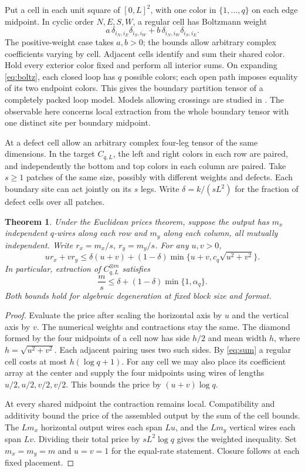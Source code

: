 \documentclass[11pt]{article}
\newtheorem{theorem}{Theorem}
\begin{document}
Put a cell in each unit square of \([0,L]^2\), with one color in
\(\{1,\ldots,q\}\) on each edge midpoint. In cyclic order \(N,E,S,W\),
a regular cell has Boltzmann weight
\begin{equation}\label{eq:boltz}
 a\,\delta_{i_N,i_E}\delta_{i_S,i_W}
 +b\,\delta_{i_N,i_W}\delta_{i_S,i_E}.
\end{equation}
The positive-weight case takes \(a,b>0\); the bounds allow arbitrary
complex coefficients varying by cell. Adjacent cells identify and sum
their shared color. Hold every exterior color fixed and perform all
interior sums. On expanding \eqref{eq:boltz}, each closed loop has \(q\)
possible colors; each open path imposes equality of its two endpoint
colors. This gives the boundary partition tensor of a completely packed
loop model. Models allowing crossings are studied in \cite{loops}.
The observable here concerns local extraction from the whole boundary
tensor with one distinct site per boundary midpoint.

At a defect cell allow an arbitrary complex four-leg tensor of the same
dimensions. In the target \(C_{q,L}\), the left and right colors in each
row are paired, and independently the bottom and top colors in each column
are paired. Take \(s\ge1\) patches of the same size, possibly with different
weights and defects. Each boundary site can act jointly on its \(s\) legs.
Write \(\delta=k/(sL^2)\) for the fraction of defect cells over all patches.

\begin{theorem}\label{thm:lattice}
Under the Euclidean prices theorem, suppose the output has \(m_x\)
independent \(q\)-wires along each row and \(m_y\) along each column,
all mutually independent. Write \(r_x=m_x/s,\ r_y=m_y/s\). For any
\(u,v>0\),
\[
 u r_x+v r_y \le \delta(u+v)
       +(1-\delta)\min\{u+v,c_q\sqrt{u^2+v^2}\}.
\]
In particular, extraction of \(C_{q,L}^{\otimes m}\) satisfies
\[
 \frac ms\le \delta+(1-\delta)\min\{1,\alpha_q\}.
\]
Both bounds hold for algebraic degeneration at fixed block size and format.
\end{theorem}

\begin{proof}
Evaluate the price after scaling the horizontal axis by \(u\) and the
vertical axis by \(v\). The numerical weights and contractions stay the
same. The diamond formed by the four midpoints of a cell now has side
\(h/2\) and mean width \(h\), where \(h=\sqrt{u^2+v^2}\). Each adjacent
pairing uses two such sides. By \eqref{eq:sum} a regular cell costs at
most \(h(\log q+1)\). For any cell we may also place its coefficient
array at the center and supply the four midpoints using wires of lengths
\(u/2,u/2,v/2,v/2\). This bounds the price by \((u+v)\log q\).

At every shared midpoint the contraction remains local. Compatibility and
additivity bound the price of the assembled output by the sum of the cell
bounds. The \(L m_x\) horizontal output wires each span \(Lu\), and the
\(L m_y\) vertical wires each span \(Lv\). Dividing their total price by
\(sL^2\log q\) gives the weighted inequality. Set \(m_x=m_y=m\) and
\(u=v=1\) for the equal-rate statement. Closure follows at each fixed
placement.
\end{proof}
\end{document}
